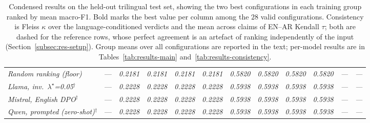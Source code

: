 \begin{table}[htbp]
\begin{tabular}{l c rrrr rrrr rr}
\itshape \quad Random ranking (floor) & --- & \itshape 0.2181 & \itshape 0.2181 & \itshape 0.2181 & \itshape 0.2181 & \itshape 0.5820 & \itshape 0.5820 & \itshape 0.5820 & \itshape 0.5820 & \itshape --- & \itshape --- \\
\itshape \quad Llama, inv.\ $\lambda^\star$=0.05$^{\dagger}$ & --- & \itshape 0.2228 & \itshape 0.2228 & \itshape 0.2228 & \itshape 0.2228 & \itshape 0.5938 & \itshape 0.5938 & \itshape 0.5938 & \itshape 0.5938 & \itshape --- & \itshape --- \\
\itshape \quad Mistral, English DPO$^{\dagger}$ & --- & \itshape 0.2228 & \itshape 0.2228 & \itshape 0.2228 & \itshape 0.2228 & \itshape 0.5938 & \itshape 0.5938 & \itshape 0.5938 & \itshape 0.5938 & \itshape --- & \itshape --- \\
\itshape \quad Qwen, prompted (zero-shot)$^{\dagger}$ & --- & \itshape 0.2228 & \itshape 0.2228 & \itshape 0.2228 & \itshape 0.2228 & \itshape 0.5938 & \itshape 0.5938 & \itshape 0.5938 & \itshape 0.5938 & \itshape --- & \itshape --- \\
\bottomrule
\end{tabular}
\caption{Condensed results on the held-out trilingual test set, showing the two best configurations in
each training group ranked by mean macro-F1. Bold marks the best value per column among the $28$ valid
configurations. Consistency is Fleiss $\kappa$ over the language-conditioned verdicts and the mean
across claims of EN--AR Kendall $\tau$; both are dashed for the reference rows, whose perfect agreement is an
artefact of ranking independently of the input (Section~\ref{subsec:res-setup}). Group means over all
configurations are reported in the text; per-model results are in Tables~\ref{tab:results-main}
and~\ref{tab:results-consistency}.}
\label{tab:results-summary}
\end{table}
